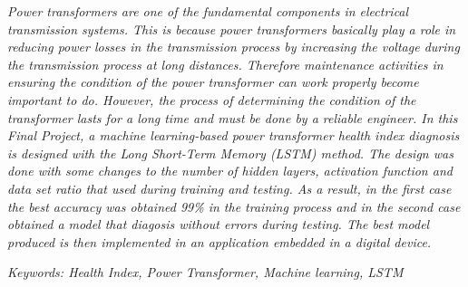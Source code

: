 \textit{Power transformers are one of the fundamental components in electrical transmission systems. This is because power transformers basically play a role in reducing power losses in the transmission process by increasing the voltage during the transmission process at long distances. Therefore maintenance activities in ensuring the condition of the power transformer can work properly become important to do. However, the process of determining the condition of the transformer lasts for a long time and must be done by a reliable engineer. 
In this Final Project, a machine learning-based power transformer health index diagnosis is designed with the Long Short-Term Memory (LSTM) method. The design was done with some changes to the number of hidden layers, activation function and data set ratio that used during training and testing. As a result, in the first case the best accuracy was obtained 99\% in the training process and in the second case obtained a model that diagosis without errors during testing. The best model produced is then implemented in an application embedded in a digital device.}

\textit{Keywords: Health Index, Power Transformer, Machine learning, LSTM}
